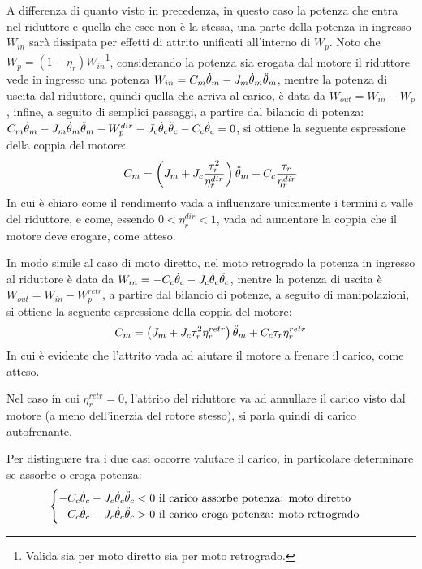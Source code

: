 A differenza di quanto visto in precedenza, in questo caso la potenza che entra nel riduttore e quella che esce non è la stessa, una parte della potenza in ingresso $W_{in}$ sarà dissipata per effetti di attrito unificati all'interno di $W_p$. 
Noto che $W_p=(1-\eta_r) W_{in}$\footnote{Valida sia per moto diretto sia per moto retrogrado.}, considerando la potenza sia erogata dal motore il riduttore vede in ingresso una potenza $W_{in}=C_m \dot{\theta}_m - J_m \dot{\theta}_m \Ddot{\theta}_m$, mentre la potenza di uscita dal riduttore, quindi quella che arriva al carico, è data da $W_{out}=W_{in}-W_p$, infine, a seguito di semplici passaggi, a partire dal bilancio di potenza: $C_m \dot{\theta}_m - J_m \dot{\theta}_m \Ddot{\theta}_m - W_p^{dir} - J_c \dot{\theta}_c \Ddot{\theta}_c - C_c \dot{\theta}_c = 0$, si ottiene la seguente espressione della coppia del motore:
\[ C_m = \left(J_m+J_c\frac{\tau^2_r}{\eta_r^{dir}}\right) \Ddot{\theta}_m + C_c\frac{\tau_r}{\eta_r^{dir}} \]
In cui è chiaro come il rendimento vada a influenzare unicamente i termini a valle del riduttore, e come, essendo $0<\eta_r^{dir}<1$, vada ad aumentare la coppia che il motore deve erogare, come atteso.

In modo simile al caso di moto diretto, nel moto retrogrado la potenza in ingresso al riduttore è data da $W_{in}=-C_c\dot{\theta}_c - J_c \dot{\theta}_c \Ddot{\theta}_c$, mentre la potenza di uscita è $W_{out}=W_{in}-W_p^{retr}$, a partire dal bilancio di potenze, a seguito di manipolazioni, si ottiene la seguente espressione della coppia del motore:
\[ C_m = \left(J_m + J_c \tau_r^2\eta_r^{retr} \right)\Ddot{\theta}_m + C_c\tau_r \eta_r^{retr} \]
In cui è evidente che l'attrito vada ad aiutare il motore a frenare il carico, come atteso.

Nel caso in cui $\eta_r^{retr}=0$, l'attrito del riduttore va ad annullare il carico visto dal motore (a meno dell'inerzia del rotore stesso), si parla quindi di carico autofrenante.


Per distinguere tra i due casi occorre valutare il carico, in particolare determinare se assorbe o eroga potenza:
\[
\begin{cases}
    -C_c\dot{\theta}_c - J_c \dot{\theta}_c \Ddot{\theta}_c < 0 \text{ il carico assorbe potenza: moto diretto} \\
    -C_c\dot{\theta}_c - J_c \dot{\theta}_c \Ddot{\theta}_c > 0 \text{ il carico eroga potenza: moto retrogrado}
\end{cases}
\]


